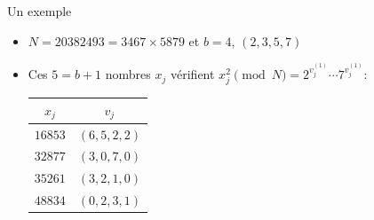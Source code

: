 \documentclass{beamer}
\begin{document}
\begin{frame}{Un exemple}

    \begin{itemize}
        
    \item $N = 20382493 = 3467 \times 5879$ et $b = 4$, $(2, 3, 5, 7)$
    \item Ces $5=b+1$ nombres $x_j$ vérifient $ x_j^2 \pmod N = 2^{v_j^{(1)}}\cdots 7^{v_j^{(1)}}$:
    \begin{center}
        \begin{tabular}{|c|c|}
            \hline
            $x_j$ & $v_j$ \\
            \hline \hline
            $16853$ & $(6,5,2,2)$\\
            \hline
            $32877$ & $(3,0,7,0)$\\
            \hline
            $35261$ & $(3,2,1,0)$\\
            \hline
            $48834$ & $(0,2,3,1)$\\
            \hline
        \end{tabular}
    \end{center}

    \end{itemize}
\end{frame}
\end{document}
